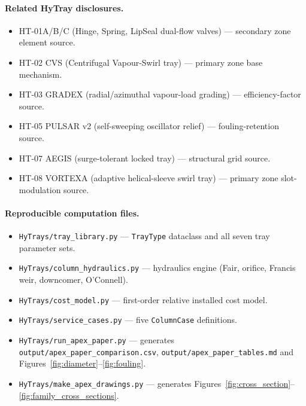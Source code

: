 \documentclass[11pt,letterpaper]{article}
\begin{document}
\paragraph{Related HyTray disclosures.}
\begin{itemize}[nosep]
  \item HT-01A/B/C (Hinge, Spring, LipSeal dual-flow valves) ---
    secondary zone element source.
  \item HT-02 CVS (Centrifugal Vapour-Swirl tray) ---
    primary zone base mechanism.
  \item HT-03 GRADEX (radial/azimuthal vapour-load grading) ---
    efficiency-factor source.
  \item HT-05 PULSAR v2 (self-sweeping oscillator relief) ---
    fouling-retention source.
  \item HT-07 AEGIS (surge-tolerant locked tray) ---
    structural grid source.
  \item HT-08 VORTEXA (adaptive helical-sleeve swirl tray) ---
    primary zone slot-modulation source.
\end{itemize}

\paragraph{Reproducible computation files.}
\begin{itemize}[nosep]
  \item \texttt{HyTrays/tray\_library.py} --- \texttt{TrayType} dataclass and
    all seven tray parameter sets.
  \item \texttt{HyTrays/column\_hydraulics.py} --- hydraulics engine
    (Fair, orifice, Francis weir, downcomer, O'Connell).
  \item \texttt{HyTrays/cost\_model.py} --- first-order relative installed
    cost model.
  \item \texttt{HyTrays/service\_cases.py} --- five \texttt{ColumnCase}
    definitions.
  \item \texttt{HyTrays/run\_apex\_paper.py} --- generates
    \texttt{output/apex\_paper\_comparison.csv}, \texttt{output/apex\_paper\_tables.md}
    and Figures~\ref{fig:diameter}--\ref{fig:fouling}.
  \item \texttt{HyTrays/make\_apex\_drawings.py} --- generates
    Figures~\ref{fig:cross_section}--\ref{fig:family_cross_sections}.
\end{itemize}
\end{document}

